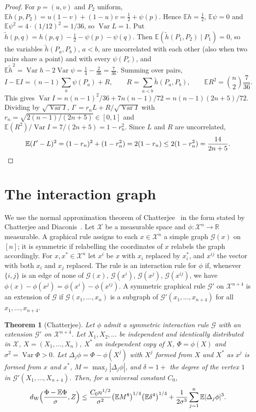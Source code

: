 \documentclass[11pt]{amsart}
\newtheorem{theorem}{Theorem}[section]
\theoremstyle{remark}
\newcommand{\E}{\mathbb{E}}
\newcommand{\Var}{\operatorname{Var}}
\newcommand{\dW}{d_{\mathrm W}}
\begin{document}
\begin{proof}
For $p=(u,v)$ and $P_2$ uniform, $\E h(p,P_2)=u(1-v)+(1-u)v=\tfrac12+\psi(p)$. Hence $\E h=\tfrac12$, $\E\psi=0$ and
$\E\psi^2=4\cdot(1/12)^2=1/36$, so $\Var L=1$. Put $\tilde h(p,q)=h(p,q)-\tfrac12-\psi(p)-\psi(q)$. Then
$\E(\tilde h(P_1,P_2)\mid P_1)=0$, so the variables $\tilde h(P_a,P_b)$, $a<b$, are uncorrelated with each other
(also when two pairs share a point) and with every $\psi(P_c)$, and
$\E\tilde h^2=\Var h-2\Var\psi=\tfrac14-\tfrac2{36}=\tfrac7{36}$. Summing over pairs,
\[
I-\E I=(n-1)\sum_a\psi(P_a)+R,\qquad R=\sum_{a<b}\tilde h(P_a,P_b),\qquad \E R^2=\binom n2\frac7{36}.
\]
This gives $\Var I=n(n-1)^2/36+7n(n-1)/72=n(n-1)(2n+5)/72$. Dividing by $\sqrt{\Var I}$,
$I'=r_nL+R/\sqrt{\Var I}$ with $r_n=\sqrt{2(n-1)/(2n+5)}\in[0,1]$ and $\E(R^2)/\Var I=7/(2n+5)=1-r_n^2$. Since $L$ and $R$ are
uncorrelated,
\[
\E(I'-L)^2=(1-r_n)^2+(1-r_n^2)=2(1-r_n)\le2(1-r_n^2)=\frac{14}{2n+5}.\qedhere
\]
\end{proof}

\section{The interaction graph}\label{sec:graph}

We use the normal approximation theorem of Chatterjee~\cite[Theorem~2.5]{Ch08} in the form stated by Chatterjee and
Diaconis~\cite[Theorem~4.1]{CD}. Let $\mathcal X$ be a measurable space and $\phi:\mathcal X^n\to\mathbb R$ measurable.
A graphical rule assigns to each $x\in\mathcal X^n$ a simple graph $\mathcal G(x)$ on $[n]$; it is symmetric if
relabelling the coordinates of $x$ relabels the graph accordingly. For $x,x^*\in\mathcal X^n$ let $x^i$ be $x$ with
$x_i$ replaced by $x_i^*$, and $x^{ij}$ the vector with both $x_i$ and $x_j$ replaced. The rule is an interaction
rule for $\phi$ if, whenever $\{i,j\}$ is an edge of none of $\mathcal G(x)$, $\mathcal G(x^i)$, $\mathcal G(x^j)$,
$\mathcal G(x^{ij})$, we have $\phi(x)-\phi(x^j)=\phi(x^i)-\phi(x^{ij})$. A symmetric graphical rule
$\mathcal G'$ on $\mathcal X^{n+4}$ is an extension of $\mathcal G$ if $\mathcal G(x_1,\dots,x_n)$ is a subgraph of
$\mathcal G'(x_1,\dots,x_{n+4})$ for all $x_1,\dots,x_{n+4}$.

\begin{theorem}[Chatterjee]\label{thm:chatterjee}
Let $\phi$ admit a symmetric interaction rule $\mathcal G$ with an extension $\mathcal G'$ on $\mathcal X^{n+4}$. Let
$X_1,X_2,\dots$ be independent and identically distributed in $\mathcal X$, $X=(X_1,\dots,X_n)$, $X^*$ an independent
copy of $X$, $\Phi=\phi(X)$ and $\sigma^2=\Var\Phi>0$. Let $\Delta_j\phi=\Phi-\phi(X^j)$ with $X^j$ formed from $X$
and $X^*$ as $x^j$ is formed from $x$ and $x^*$, $M=\max_j|\Delta_j\phi|$, and $\delta=1+$ the degree of the vertex $1$ in
$\mathcal G'(X_1,\dots,X_{n+4})$. Then, for a universal constant $C_0$,
\[
\dW\Bigl(\frac{\Phi-\E\Phi}{\sigma},Z\Bigr)\le\frac{C_0n^{1/2}}{\sigma^2}\bigl(\E M^8\bigr)^{1/4}\bigl(\E\delta^4\bigr)^{1/4}
+\frac1{2\sigma^3}\sum_{j=1}^n\E|\Delta_j\phi|^3.
\]
\end{theorem}
\end{document}
